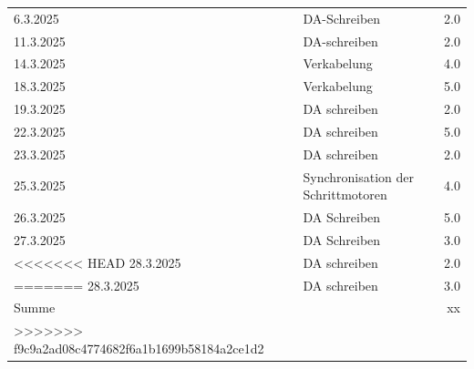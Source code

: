 \begin{longtable}{|l|p{10cm}|r|}
    6.3.2025	&	DA-Schreiben	&	2.0\\
    11.3.2025	&	DA-schreiben	&	2.0\\
    14.3.2025	&	Verkabelung     &	4.0\\
    18.3.2025	&	Verkabelung	&	5.0\\
    19.3.2025   &   DA schreiben    &   2.0 \\
    22.3.2025   &   DA schreiben    &   5.0 \\
    23.3.2025   &   DA schreiben    &   2.0 \\
    25.3.2025	&	Synchronisation der Schrittmotoren	&	4.0\\
    26.3.2025   &   DA Schreiben    &   5.0 \\
    27.3.2025   &   DA Schreiben    &   3.0 \\
<<<<<<< HEAD
    28.3.2025	&	DA schreiben	&	2.0\\
=======
    28.3.2025	&	DA schreiben	&	3.0\\

    \hline
    \hline
    Summe & & xx \\

>>>>>>> f9c9a2ad08c4774682f6a1b1699b58184a2ce1d2
\end{longtable}
\newpage

